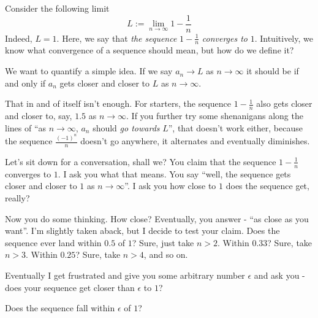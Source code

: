 

Consider the following limit
$$
L := \lim_{n \rightarrow \infty} 1 - \dfrac{1}{n}
$$
Indeed, $L = 1$. Here, we say that \emph{the sequence} $1 - \frac{1}{n}$ \emph{converges to} $1$. Intuitively, we know what convergence of a sequence should mean, but how do we define it?

We want to quantify a simple idea. If we say $a_n \rightarrow L$ as $n \rightarrow \infty$ it should be if and only if $a_n$ gets closer and closer to $L$ as $n \rightarrow \infty$.

That in and of itself isn't enough. For starters, the sequence $1 - \frac 1 n$ also gets closer and closer to, say, $1.5$ as $n \rightarrow \infty$. If you further try some shenanigans along the lines of ``as $n \rightarrow \infty$, $a_n$ should \emph{go towards} $L$'', that doesn't work either, because the sequence $\frac{(-1)^n}{n}$ doesn't go anywhere, it alternates and eventually diminishes.

Let's sit down for a conversation, shall we? You claim that the sequence $1 - \frac 1 n$ converges to $1$. I ask you what that means. You say ``well, the sequence gets closer and closer to $1$ as $n \rightarrow \infty$''. I ask you how close to $1$ does the sequence get, really?

Now you do some thinking. How close? Eventually, you answer - ``as close as you want''. I'm slightly taken aback, but I decide to test your claim. Does the sequence ever land within $0.5$ of $1$? Sure, just take $n > 2$. Within $0.33$? Sure, take $n > 3$. Within $0.25$? Sure, take $n > 4$, and so on.

Eventually I get frustrated and give you some arbitrary number $\epsilon$ and ask you - does your sequence get closer than $\epsilon$ to $1$?

\begin{smrg}
\begin{center}
Does the sequence fall within $\epsilon$ of $1$?
\end{center}
\end{smrg}

